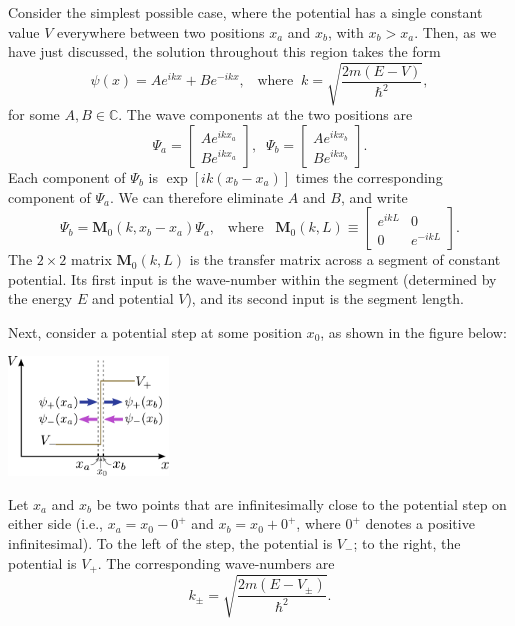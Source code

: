 \documentclass[prx,12pt]{revtex4-2}
\begin{document}
Consider the simplest possible case, where the potential has a single
constant value $V$ everywhere between two positions $x_a$ and $x_b$,
with $x_b > x_a$.  Then, as we have just discussed, the solution
throughout this region takes the form
\begin{equation}
  \psi(x) = A e^{ik x} + B e^{-ik x}, \;\;\; \mathrm{where}\;\; k = \sqrt{\frac{2m(E-V)}{\hbar^2}},
\end{equation}
for some $A, B\in\mathbb{C}$.  The wave components at the two
positions are
\begin{equation}
  \Psi_a = \begin{bmatrix} A e^{ik x_a} \\ B e^{ikx_a} \end{bmatrix}, \;\; \Psi_b = \begin{bmatrix} A e^{ik x_b} \\ B e^{ikx_b} \end{bmatrix}.
\end{equation}
Each component of $\Psi_b$ is $\exp[ik(x_b-x_a)]$ times the
corresponding component of $\Psi_a$.  We can therefore eliminate $A$
and $B$, and write
\begin{equation}
  \Psi_b = \mathbf{M}_0(k, x_b-x_a) \Psi_a, \;\;\;\mathrm{where}\;\;\; \mathbf{M}_0(k,L) \equiv \begin{bmatrix}e^{ikL} & 0 \\ 0 & e^{-ikL}\end{bmatrix}.
\end{equation}
The $2\times2$ matrix $\mathbf{M}_0(k,L)$ is the transfer matrix
across a segment of constant potential.  Its first input is the
wave-number within the segment (determined by the energy $E$ and
potential $V$), and its second input is the segment length.

Next, consider a potential step at some position $x_0$, as shown in
the figure below:

\begin{center}
  \includegraphics[width=0.32\textwidth]{transfer_step}
\end{center}

\noindent
Let $x_a$ and $x_b$ be two points that are infinitesimally close to
the potential step on either side (i.e., $x_a = x_0 - 0^+$ and $x_b =
x_0 + 0^+$, where $0^+$ denotes a positive infinitesimal).  To the
left of the step, the potential is $V_-$; to the right, the potential
is $V_+$.  The corresponding wave-numbers are
\begin{equation}
  k_\pm = \sqrt{\frac{2m(E-V_\pm)}{\hbar^2}}.
\end{equation}
\end{document}
